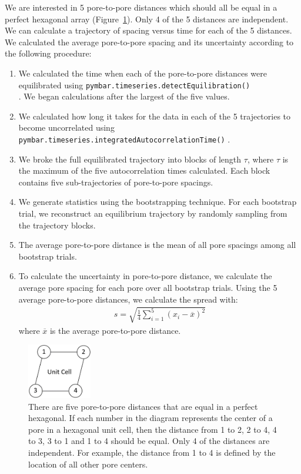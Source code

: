 \documentclass{article}
\begin{document}
  \vspace{1em} 
  We are interested in 5 pore-to-pore distances which should all be
  equal in a perfect hexagonal array (Figure~\ref{fig:p2p_diagram}). Only 4 of
  the 5 distances are independent. We can calculate a trajectory of spacing
  versus time for each of the 5 distances. We calculated the average pore-to-pore
  spacing and its uncertainty according to the following procedure:
   \begin{enumerate}
	\item We calculated the time when each of the pore-to-pore distances
	were equilibrated using \texttt{pymbar.timeseries.detectEquilibration()} \\
	\cite{chodera_simple_2016,shirts_statistically_2008}. We began calculations
	after the largest of the five values.
	\item We calculated how long it takes for the data in each of the 5
	trajectories to become uncorrelated using \texttt{pymbar.timeseries.integratedAutocorrelationTime()}
	\cite{chodera_simple_2016,shirts_statistically_2008}. 
	\item We broke the full equilibrated trajectory into blocks of length $\tau$, where
	$\tau$ is the maximum of the five autocorrelation times calculated. Each block contains
	five sub-trajectories of pore-to-pore spacings.   
	\item We generate statistics using the bootstrapping technique. For
	each bootstrap trial, we reconstruct an equilibrium trajectory by randomly
	sampling from the trajectory blocks. 
	\item The average pore-to-pore distance is the mean of all pore
	spacings among all bootstrap trials.
	\item To calculate the uncertainty in pore-to-pore distance, we calculate the average 
	pore spacing for each pore over all bootstrap trials. Using the 5 average 
	pore-to-pore distances, we calculate the spread with:
	\begin{align}
	s = \sqrt{\frac{1}{4} \sum_{i=1}^5 (x_i - \overline{x})^2} 
	\end{align}
	where $\overline{x}$ is the average pore-to-pore distance.
  \end{enumerate}

  \begin{figure}
	\centering
	\includegraphics[width=0.25\textwidth]{p2p_diagram.png}
	\caption{There are five pore-to-pore distances that are equal in a perfect
		hexagonal. If each number in the diagram represents the center of a
		pore in a hexagonal unit cell, then the distance from 1 to 2, 2 to 4, 
		4 to 3, 3 to 1 and 1 to 4 should be equal. Only 4 of the distances
		are independent. For example, the distance from 1 to 4 is defined by
		the location of all other pore centers.}
	\label{fig:p2p_diagram}
  \end{figure}
\end{document}
